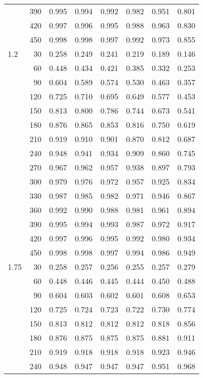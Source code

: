 \documentclass[bimj,fleqn]{w-art}\usepackage[]{graphicx}\usepackage[]{color}
\theoremstyle{plain}
\theoremstyle{definition}
\begin{document}
\begin{table}[ht]
\begin{tabular}{lrrrrrrr}
   & 390 & 0.995 & 0.994 & 0.992 & 0.982 & 0.951 & 0.801 \\ 
   & 420 & 0.997 & 0.996 & 0.995 & 0.988 & 0.963 & 0.830 \\ 
   & 450 & 0.998 & 0.998 & 0.997 & 0.992 & 0.973 & 0.855 \\ 
  1.2 & 30 & 0.258 & 0.249 & 0.241 & 0.219 & 0.189 & 0.146 \\ 
   & 60 & 0.448 & 0.434 & 0.421 & 0.385 & 0.332 & 0.253 \\ 
   & 90 & 0.604 & 0.589 & 0.574 & 0.530 & 0.463 & 0.357 \\ 
   & 120 & 0.725 & 0.710 & 0.695 & 0.649 & 0.577 & 0.453 \\ 
   & 150 & 0.813 & 0.800 & 0.786 & 0.744 & 0.673 & 0.541 \\ 
   & 180 & 0.876 & 0.865 & 0.853 & 0.816 & 0.750 & 0.619 \\ 
   & 210 & 0.919 & 0.910 & 0.901 & 0.870 & 0.812 & 0.687 \\ 
   & 240 & 0.948 & 0.941 & 0.934 & 0.909 & 0.860 & 0.745 \\ 
   & 270 & 0.967 & 0.962 & 0.957 & 0.938 & 0.897 & 0.793 \\ 
   & 300 & 0.979 & 0.976 & 0.972 & 0.957 & 0.925 & 0.834 \\ 
   & 330 & 0.987 & 0.985 & 0.982 & 0.971 & 0.946 & 0.867 \\ 
   & 360 & 0.992 & 0.990 & 0.988 & 0.981 & 0.961 & 0.894 \\ 
   & 390 & 0.995 & 0.994 & 0.993 & 0.987 & 0.972 & 0.917 \\ 
   & 420 & 0.997 & 0.996 & 0.995 & 0.992 & 0.980 & 0.934 \\ 
   & 450 & 0.998 & 0.998 & 0.997 & 0.994 & 0.986 & 0.949 \\ 
  1.75 & 30 & 0.258 & 0.257 & 0.256 & 0.255 & 0.257 & 0.279 \\ 
   & 60 & 0.448 & 0.446 & 0.445 & 0.444 & 0.450 & 0.488 \\ 
   & 90 & 0.604 & 0.603 & 0.602 & 0.601 & 0.608 & 0.653 \\ 
   & 120 & 0.725 & 0.724 & 0.723 & 0.722 & 0.730 & 0.774 \\ 
   & 150 & 0.813 & 0.812 & 0.812 & 0.812 & 0.818 & 0.856 \\ 
   & 180 & 0.876 & 0.875 & 0.875 & 0.875 & 0.881 & 0.911 \\ 
   & 210 & 0.919 & 0.918 & 0.918 & 0.918 & 0.923 & 0.946 \\ 
   & 240 & 0.948 & 0.947 & 0.947 & 0.947 & 0.951 & 0.968 \\ 

\end{tabular}
\end{table}
\end{document}

